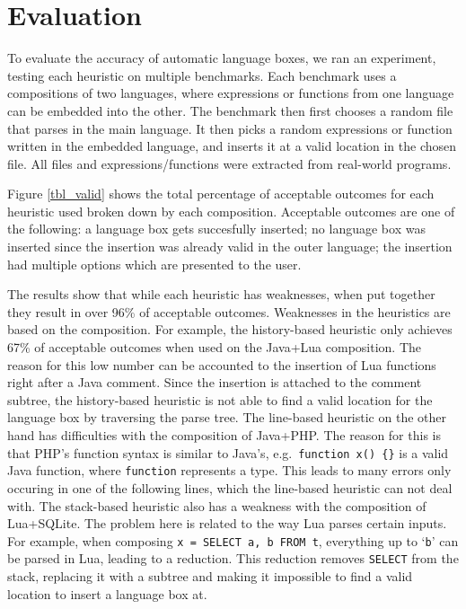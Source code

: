 \documentclass[sigplan,screen]{acmart}\settopmatter{printfolios=true,printccs=false,printacmref=false}
\begin{document}
\section{Evaluation}
\label{sec:evaluation}

To evaluate the accuracy of automatic language boxes, we ran an experiment,
testing each heuristic on multiple benchmarks. Each benchmark uses a
compositions of two languages, where expressions or functions from one language
can be embedded into the other. The benchmark then first chooses a random file
that parses in the main language. It then picks a random expressions or
function written in the embedded language, and inserts it at a valid location
in the chosen file. All files and expressions/functions were extracted from
real-world programs.

Figure \ref{tbl_valid} shows the total percentage of
acceptable outcomes for each heuristic used broken down by each composition.
Acceptable outcomes are one of the following: a language box gets succesfully
inserted; no language box was inserted since the insertion was already valid in
the outer language; the insertion had multiple options which are presented to
the user.

The results show that while each heuristic has weaknesses, when put together
they result in over 96\% of acceptable outcomes. Weaknesses in the heuristics
are based on the composition. For example, the history-based heuristic only
achieves 67\% of acceptable outcomes when used on the Java+Lua composition. The
reason for this low number can be accounted to the insertion of Lua functions
right after a Java comment.  Since the insertion is attached to the comment
subtree, the history-based heuristic is not able to find a valid location for
the language box by traversing the parse tree.  The line-based heuristic on the
other hand has difficulties with the composition of Java+PHP. The reason for
this is that PHP's function syntax is similar to Java's, e.g.~\texttt{function
x() \{\}} is a valid Java function, where \texttt{function} represents a type.
This leads to many errors only occuring in one of the following lines, which
the line-based heuristic can not deal with. The stack-based heuristic also has
a weakness with the composition of Lua+SQLite. The problem here is related to
the way Lua parses certain inputs. For example, when composing \texttt{x =
SELECT a, b FROM t}, everything up to `\texttt{b}' can be parsed in Lua,
leading to a reduction. This reduction removes \texttt{SELECT} from the stack,
replacing it with a subtree and making it impossible to find a valid location
to insert a language box at.
\end{document}
